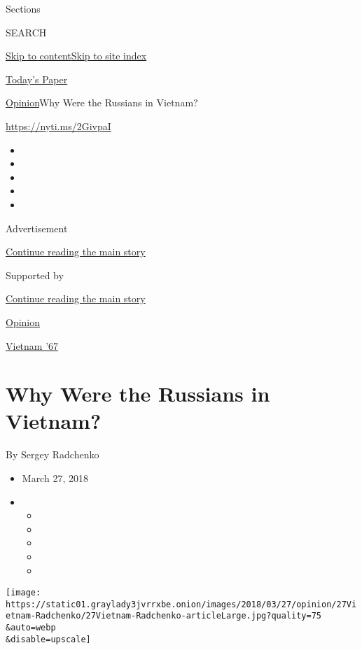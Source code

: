Sections

SEARCH

\protect\hyperlink{site-content}{Skip to
content}\protect\hyperlink{site-index}{Skip to site index}

\href{https://myaccount.nytimes3xbfgragh.onion/auth/login?response_type=cookie\&client_id=vi}{}

\href{https://www.nytimes3xbfgragh.onion/section/todayspaper}{Today's
Paper}

\href{/section/opinion}{Opinion}\textbar{}Why Were the Russians in
Vietnam?

\url{https://nyti.ms/2GivpaI}

\begin{itemize}
\item
\item
\item
\item
\item
\end{itemize}

Advertisement

\protect\hyperlink{after-top}{Continue reading the main story}

Supported by

\protect\hyperlink{after-sponsor}{Continue reading the main story}

\href{/section/opinion}{Opinion}

\href{/column/vietnam-67}{Vietnam '67}

\hypertarget{why-were-the-russians-in-vietnam}{%
\section{Why Were the Russians in
Vietnam?}\label{why-were-the-russians-in-vietnam}}

By Sergey Radchenko

\begin{itemize}
\item
  March 27, 2018
\item
  \begin{itemize}
  \item
  \item
  \item
  \item
  \item
  \end{itemize}
\end{itemize}

\texttt{[image: https://static01.graylady3jvrrxbe.onion/images/2018/03/27/opinion/27Vietnam-Radchenko/27Vietnam-Radchenko-articleLarge.jpg?quality=75\\\&auto=webp\\\&disable=upscale]}


